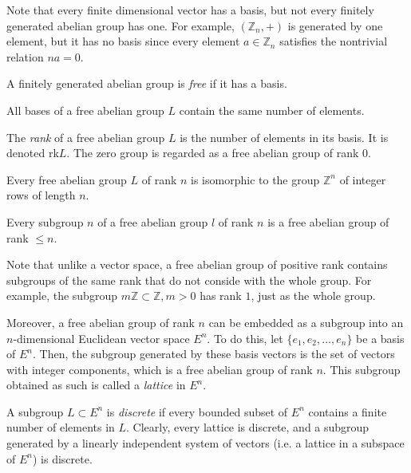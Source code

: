 \documentclass{article}
\begin{document}
    Note that every finite dimensional vector has a basis, but not every finitely generated abelian group has one. For example, $(\mathbb{Z}_n, +)$ is generated by one element, but it has no basis since every element $a \in \mathbb{Z}_n$ satisfies the nontrivial relation $n a = 0$. 

    \begin{definition}
      A finitely generated abelian group is \textit{free} if it has a basis. 
    \end{definition}

    \begin{theorem}
      All bases of a free abelian group $L$ contain the same number of elements. 
    \end{theorem}

    \begin{definition}
      The \textit{rank} of a free abelian group $L$ is the number of elements in its basis. It is denoted rk$L$. The zero group is regarded as a free abelian group of rank $0$. 
    \end{definition}

    \begin{theorem}
      Every free abelian group $L$ of rank $n$ is isomorphic to the group $\mathbb{Z}^n$ of integer rows of length $n$. 
    \end{theorem}

    \begin{theorem}
      Every subgroup $n$ of a free abelian group $l$ of rank $n$ is a free abelian group of rank $ \leq n$. 
    \end{theorem}

    Note that unlike a vector space, a free abelian group of positive rank contains subgroups of the same rank that do not conside with the whole group. For example, the subgroup $m \mathbb{Z} \subset \mathbb{Z}, m > 0$ has rank $1$, just as the whole group. 

    Moreover, a free abelian group of rank $n$ can be embedded as a subgroup into an $n$-dimensional Euclidean vector space $E^n$. To do this, let $\{e_1, e_2, ..., e_n\}$ be a basis of $E^n$. Then, the subgroup generated by these basis vectors is the set of vectors with integer components, which is a free abelian group of rank $n$. This subgroup obtained as such is called a \textit{lattice} in $E^n$. 

    \begin{definition}
      A subgroup $L \subset E^n$ is \textit{discrete} if every bounded subset of $E^n$ contains a finite number of elements in $L$. Clearly, every lattice is discrete, and a subgroup generated by a linearly independent system of vectors (i.e. a lattice in a subspace of $E^n$) is discrete. 
    \end{definition}
\end{document}
